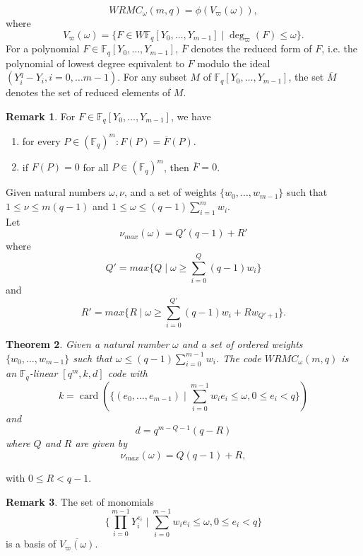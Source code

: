 \documentclass{article}
\theoremstyle{plain}
\newtheorem{thm}{Theorem}[section]
\theoremstyle{definition}
\newtheorem{rem}[thm]{Remark}
\DeclareMathOperator{\card}{card}
\begin{document}
\begin{equation}
WRMC_{\omega}(m,q)=\phi(V_{\varpi}(\omega)),
\end{equation}
where
\begin{equation}
V_{\varpi}(\omega)=\{F\in W\mathbb{F}_{q}[Y_{0},\ldots ,Y_{m-1}]\mid \deg_{\varpi}(F)\leq \omega\}.
\end{equation}
For a polynomial $F\in \mathbb{F}_{q}[Y_{0},\ldots ,Y_{m-1}]$, $\overline{F}$ denotes the reduced form of $F$, i.e. the polynomial of lowest degree equivalent to $F$ modulo the ideal $(Y_{i}^{q}-Y_{i},i=0,\ldots m-1)$. For any subset $M$ of $\mathbb{F}_{q}[Y_{0},\ldots ,Y_{m-1}]$, the set $\overline{M}$ denotes the set of reduced elements of $M$.
\begin{rem}
For $F\in \mathbb{F}_{q}[Y_{0},\ldots ,Y_{m-1}]$, we have
\begin{enumerate}
\item for every $P \in (\mathbb{F}_{q})^{m}: F(P)= \overline{F}(P)$.
\item if $F(P)=0$ for all $P\in (\mathbb{F}_{q})^{m}$, then $\overline{F}=0$.
\end{enumerate}
\end{rem}
Given natural numbers $\omega,\nu$, and a set of weights $\{w_{0},\ldots ,w_{m-1}\}$ such that $1\leq \nu\leq m(q-1)$ and $1\leq \omega\leq (q-1)\sum_{i=1}^{m}w_{i}$.\\
Let
\begin{equation*}
\nu_{max}(\omega)=Q'(q-1)+R'
\end{equation*}
where
\begin{equation*}
Q'=max\{Q\mid \omega\geq \sum_{i=0}^{Q}(q-1)w_{i}\}
\end{equation*}
and
\begin{equation*}
R'=max\{R\mid \omega\geq \sum_{i=0}^{Q'}(q-1)w_{i}+Rw_{Q'+1}\}.
\end{equation*}
\begin{thm}
Given a natural number $\omega$ and a set of ordered weights\\$\{w_{0},\ldots ,w_{m-1}\}$ such that $\omega \leq (q-1)\sum_{i=0}^{m-1}w_{i}$. The code $WRMC_{\omega}(m,q)$ is an $\mathbb{F}_{q}$-linear $[q^{m},k,d]$ code with
\begin{equation*}
k=\card(\{(e_{0},\ldots ,e_{m-1})\mid \sum_{i=0}^{m-1}w_{i}e_{i}\leq \omega, 0\leq e_{i}<q\})
\end{equation*}
and
\begin{equation*}
d=q^{m-Q-1}(q-R)
\end{equation*}
where $Q$ and $R$ are given by
\begin{equation*}
\nu_{max}(\omega)=Q(q-1)+R,
\end{equation*}
\end{thm}
with $0\leq R< q-1$.
\begin{rem}
The set of monomials
\begin{equation*}
\{\prod_{i=0}^{m-1}Y_{i}^{e_{i}}\mid \sum_{i=0}^{m-1}w_{i}e_{i}\leq \omega,0\leq e_{i}<q\}
\end{equation*}
is a basis of $\overline{V_{\varpi}(\omega)}$.
\end{rem}
\end{document}
